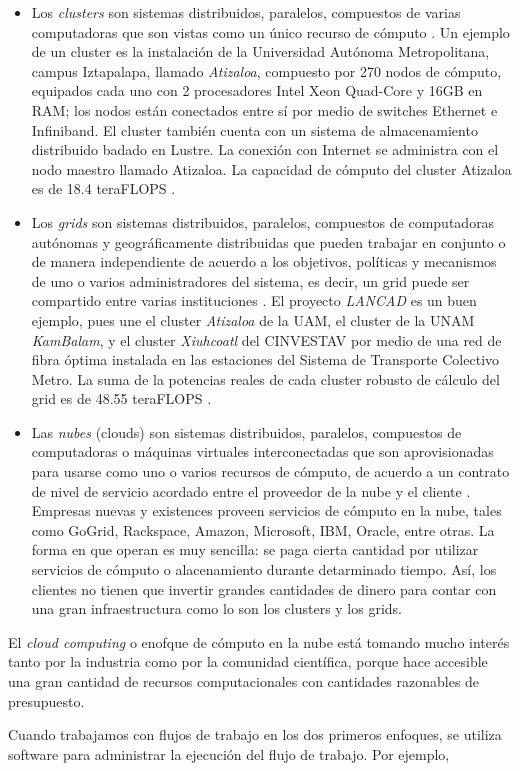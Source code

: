 \documentclass{article}
\begin{document}
\begin{itemize}
\item Los \emph{clusters} son sistemas distribuidos, paralelos, compuestos de varias computadoras que son vistas como un único recurso de cómputo \cite{buyya2009cloud}. Un ejemplo de un cluster es la instalación de la Universidad Autónoma Metropolitana, campus Iztapalapa, llamado \emph{Atizaloa}, compuesto por 270 nodos de cómputo, equipados cada uno con 2 procesadores Intel Xeon Quad-Core y 16GB en RAM; los nodos están conectados entre sí por medio de switches Ethernet e Infiniband. El cluster también cuenta con un sistema de almacenamiento distribuido badado en Lustre. La conexión con Internet se administra con el nodo maestro llamado Atizaloa. La capacidad de cómputo del cluster Atizaloa es de 18.4 teraFLOPS \cite{uamz2013tizaloa}.

\item Los \emph{grids} son sistemas distribuidos, paralelos, compuestos de computadoras autónomas y geográficamente distribuidas que pueden trabajar en conjunto o de manera independiente de acuerdo a los objetivos, políticas y mecanismos de uno o varios administradores del sistema, es decir, un grid puede ser compartido entre varias instituciones \cite{buyya2009cloud}. El proyecto \emph{LANCAD} es un buen ejemplo, pues une el cluster \emph{Atizaloa} de la UAM, el cluster de la UNAM \emph{KamBalam}, y el cluster \emph{Xiuhcoatl} del CINVESTAV por medio de una red de fibra óptima instalada en las estaciones del Sistema de Transporte Colectivo Metro. La suma de la potencias reales de cada cluster robusto de cálculo del grid es de 48.55 teraFLOPS \cite{lancad2013xiuhcoatl}.

\item Las \emph{nubes} (clouds) son sistemas distribuidos, paralelos, compuestos de computadoras o máquinas virtuales interconectadas que son aprovisionadas para usarse como uno o varios recursos de cómputo, de acuerdo a un contrato de nivel de servicio acordado entre el proveedor de la nube y el cliente \cite{buyya2009cloud}. Empresas nuevas y existences proveen servicios de cómputo en la nube, tales como GoGrid, Rackspace, Amazon, Microsoft, IBM, Oracle, entre otras. La forma en que operan es muy sencilla: se paga cierta cantidad por utilizar servicios de cómputo o alacenamiento durante detarminado tiempo. Así, los clientes no tienen que invertir grandes cantidades de dinero para contar con una gran infraestructura como lo son los clusters y los grids.
\end{itemize}

El \emph{cloud computing} o enofque de cómputo en la nube está tomando mucho interés tanto por la industria como por la comunidad científica, porque hace accesible una gran cantidad de recursos computacionales con cantidades razonables de presupuesto.

Cuando trabajamos con flujos de trabajo en los dos primeros enfoques, se utiliza software para administrar la ejecución del flujo de trabajo. Por ejemplo, 



\end{document}
